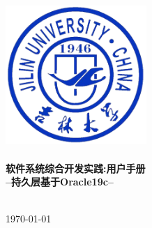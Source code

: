 \begin{titlepage}

\begin{center}


\includegraphics[width=0.4\textwidth]{figure/JLU}\\[1cm]    

%


\HRule \\[0.4cm]
{ \huge \bfseries 软件系统综合开发实践:用户手册}\\[0.4cm]
{  \bfseries --持久层基于Oracle19c--}\\[0.4cm]

\HRule \\[1.5cm]


\vfill

{\large \today}

\end{center}

\end{titlepage}

